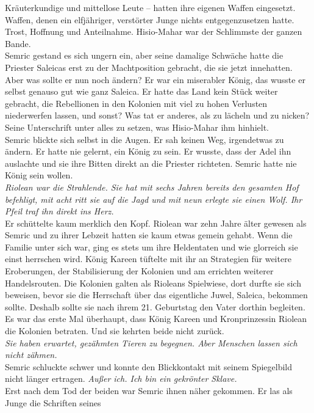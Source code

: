 Kräuterkundige und mittellose Leute – hatten ihre eigenen Waffen eingesetzt. Waffen, denen ein 
elfjähriger, verstörter Junge nichts entgegenzusetzen hatte. Trost, Hoffnung und Anteilnahme. 
Hisio-Mahar war der Schlimmste der ganzen Bande.\\
Semric gestand es sich ungern ein, aber seine damalige Schwäche hatte die Priester Saleicas erst zu 
der Machtposition gebracht, die sie jetzt innehatten. Aber was sollte er nun noch ändern? Er war ein 
miserabler König, das wusste er selbst genauso gut wie ganz Saleica. Er hatte das Land kein Stück 
weiter gebracht, die Rebellionen in den Kolonien mit viel zu hohen Verlusten niederwerfen lassen, 
und sonst? Was tat er anderes, als zu lächeln und zu nicken? Seine Unterschrift unter alles zu 
setzen, was Hisio-Mahar ihm hinhielt.\\
Semric blickte sich selbst in die Augen. Er sah keinen Weg, irgendetwas zu ändern. Er hatte nie 
gelernt, ein König zu sein. Er wusste, dass der Adel ihn auslachte und sie ihre Bitten direkt an die 
Priester richteten. Semric hatte nie König sein wollen.\\
\textit{Riolean war die Strahlende. Sie hat mit sechs Jahren bereits den gesamten Hof befehligt, 
mit acht ritt sie auf die Jagd und mit neun erlegte sie einen Wolf. Ihr Pfeil traf ihn direkt ins 
Herz.}\\
Er schüttelte kaum merklich den Kopf. Riolean war zehn Jahre älter gewesen als Semric und zu ihrer 
Lebzeit hatten sie kaum etwas gemein gehabt. Wenn die Familie unter sich war, ging es stets um ihre 
Heldentaten und wie glorreich sie einst herrschen wird. König Kareen tüftelte mit ihr an Strategien 
für weitere Eroberungen, der Stabilisierung der Kolonien und am errichten weiterer Handelsrouten. 
Die Kolonien galten als Rioleans Spielwiese, dort durfte sie sich beweisen, bevor sie die Herrschaft 
über das eigentliche Juwel, Saleica, bekommen sollte. Deshalb sollte sie nach ihrem 21. Geburtstag 
den Vater dorthin begleiten. Es war das erste Mal überhaupt, dass König Kareen und Kronprinzessin 
Riolean die Kolonien betraten. Und sie kehrten beide nicht zurück.\\
\textit{Sie haben erwartet, gezähmten Tieren zu begegnen. Aber Menschen lassen sich nicht zähmen.}\\
Semric schluckte schwer und konnte den Blickkontakt mit seinem Spiegelbild nicht länger ertragen. 
\textit{Außer ich. Ich bin ein gekrönter Sklave.}\\
Erst nach dem Tod der beiden war Semric ihnen näher gekommen. Er las als Junge die Schriften seines 
